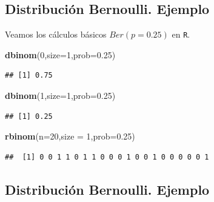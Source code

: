 \documentclass[]{book}
\newenvironment{Shaded}{\begin{snugshade}}{\end{snugshade}}
\newcommand{\DataTypeTok}[1]{\textcolor[rgb]{0.13,0.29,0.53}{#1}}
\newcommand{\DecValTok}[1]{\textcolor[rgb]{0.00,0.00,0.81}{#1}}
\newcommand{\FloatTok}[1]{\textcolor[rgb]{0.00,0.00,0.81}{#1}}
\newcommand{\KeywordTok}[1]{\textcolor[rgb]{0.13,0.29,0.53}{\textbf{#1}}}
\newcommand{\NormalTok}[1]{#1}
\begin{document}
\hypertarget{distribuciuxf3n-bernoulli.-ejemplo}{%
\subsection{Distribución Bernoulli. Ejemplo}\label{distribuciuxf3n-bernoulli.-ejemplo}}

Veamos los cálculos básicos \(Ber(p=0.25)\) en \texttt{R}.

\begin{Shaded}
\begin{Highlighting}[]
\KeywordTok{dbinom}\NormalTok{(}\DecValTok{0}\NormalTok{,}\DataTypeTok{size=}\DecValTok{1}\NormalTok{,}\DataTypeTok{prob=}\FloatTok{0.25}\NormalTok{)}
\end{Highlighting}
\end{Shaded}

\begin{verbatim}
## [1] 0.75
\end{verbatim}

\begin{Shaded}
\begin{Highlighting}[]
\KeywordTok{dbinom}\NormalTok{(}\DecValTok{1}\NormalTok{,}\DataTypeTok{size=}\DecValTok{1}\NormalTok{,}\DataTypeTok{prob=}\FloatTok{0.25}\NormalTok{)}
\end{Highlighting}
\end{Shaded}

\begin{verbatim}
## [1] 0.25
\end{verbatim}

\begin{Shaded}
\begin{Highlighting}[]
\KeywordTok{rbinom}\NormalTok{(}\DataTypeTok{n=}\DecValTok{20}\NormalTok{,}\DataTypeTok{size =} \DecValTok{1}\NormalTok{,}\DataTypeTok{prob=}\FloatTok{0.25}\NormalTok{)}
\end{Highlighting}
\end{Shaded}

\begin{verbatim}
##  [1] 0 0 1 1 0 1 1 0 0 0 1 0 0 1 0 0 0 0 0 1
\end{verbatim}

\hypertarget{distribuciuxf3n-bernoulli.-ejemplo-1}{%
\subsection{Distribución Bernoulli. Ejemplo}\label{distribuciuxf3n-bernoulli.-ejemplo-1}}
\end{document}
